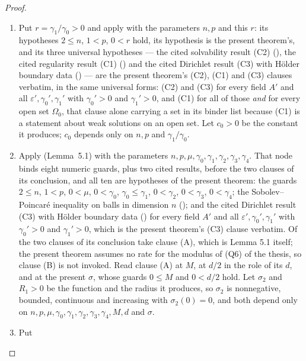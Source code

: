 \begin{proof}
\begin{enumerate}
\item[(1a)] Put $r=\gamma_1/\gamma_0>0$ and apply
   with the parameters $n,p$ and this $r$: its
  hypotheses $2\le n$, $1<p$, $0<r$ hold, its hypothesis
   is the present theorem's, and its three
  universal hypotheses --- the cited solvability result (C2)
  (), the cited regularity result (C1)
  () and the cited Dirichlet result (C3) with
  H\"older boundary data () --- are the present
  theorem's (C2), (C1) and (C3) clauses verbatim, in the same universal forms:
  (C2) and (C3) for every field $A'$ and all $\varepsilon',\gamma_0',\gamma_1'$
  with $\gamma_0'>0$ and $\gamma_1'>0$, and (C1) for all of those \emph{and} for
  every open set $\Omega_0$, that clause alone carrying a set in its binder list
  because (C1) is a statement about weak solutions on an open set.  Let $c_0>0$ be the constant
  it produces; $c_0$ depends only on $n,p$ and $\gamma_1/\gamma_0$.
\item[(1b)] Apply  (Lemma~5.1) with
  the parameters $n,p,\mu,\gamma_0,\gamma_1,\gamma_2,\gamma_3,\gamma_4$.  That
  node binds eight numeric guards, plus two cited results, before the two
  clauses of its conclusion, and all ten are hypotheses of the present theorem:
  the guards $2\le n$, $1<p$, $0<\mu$, $0<\gamma_0$, $\gamma_0\le\gamma_1$,
  $0<\gamma_2$, $0<\gamma_3$, $0<\gamma_4$; the Sobolev--Poincar\'e inequality
  on balls in dimension $n$ (); and the cited
  Dirichlet result (C3) with H\"older boundary data
  () for every field $A'$ and all
  $\varepsilon',\gamma_0',\gamma_1'$ with $\gamma_0'>0$ and $\gamma_1'>0$, which
  is the present theorem's (C3) clause verbatim.  Of the two clauses of its
  conclusion take clause (A), which is Lemma 5.1 itself; the present theorem
  assumes no rate for the modulus of (Q6) of the thesis, so clause (B) is not
  invoked.  Read clause (A) at $M$, at $d/2$ in the role of its $d$, and at the
  present $\sigma$, whose guards $0\le M$ and $0<d/2$ hold.
  Let $\sigma_2$ and $R_1>0$ be the function and the radius it produces, so
  $\sigma_2$ is nonnegative, bounded, continuous and increasing with
  $\sigma_2(0)=0$, and both depend only on
  $n,p,\mu,\gamma_0,\gamma_1,\gamma_2,\gamma_3,\gamma_4,M,d$ and $\sigma$.
\item[(1c)] Put

\end{enumerate}
\end{proof}
